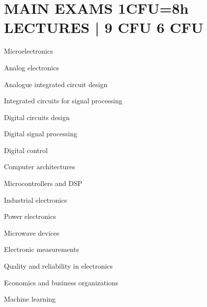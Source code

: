 \newcommand{\redminus}{\textcolor{matred}{\faMinus}}
\newcommand{\blueminus}{\textcolor{matblue}{\faMinus}}

\section*{MAIN EXAMS
            \hfill
            1CFU=8h LECTURES \hspace{1mm} | \hspace{1mm} 
            \textcolor{matred}{\faMinus \hspace{1mm} 9 CFU}
            \textcolor{matblue}{\faMinus \hspace{1mm} 6 CFU}
            }
\begin{minipage}[t]{0.45\textwidth}
    \begin{description}[leftmargin=5mm]
        \item[\redminus] Microelectronics
        \item[\redminus] Analog electronics
        \item[\blueminus] Analogue integrated circuit design
        \item[\redminus] Integrated circuits for signal processing
        \item[\redminus] Digital circuits design
        \item[\blueminus] Digital signal processing
        \item[\blueminus] Digital control
        \item[\redminus] Computer architectures
    \end{description}
\end{minipage}
\hfill
\begin{minipage}[t]{0.45\textwidth}
    \begin{description}[leftmargin=5mm]
        \item[\blueminus] Microcontrollers and DSP
        \item[\redminus] Industrial electronics 
        \item[\redminus] Power electronics
        \item[\redminus] Microwave devices
        \item[\redminus] Electronic measurements
        \item[\redminus] Quality and reliability in electronics
        \item[\redminus] Economics and business organizations 
        \item[\blueminus] Machine learning
    \end{description}
\end{minipage}